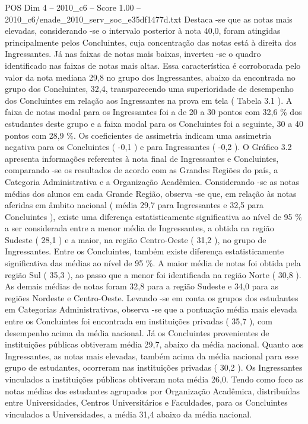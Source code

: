 \begin{textsample}{POS Dim 4 – 2010\_c6 – Score 1.00 – 2010\_c6/enade\_2010\_serv\_soc\_e35df1477d.txt}
Destaca -se que as notas mais elevadas, considerando -se o intervalo posterior à nota 40,0, foram atingidas principalmente pelos Concluintes, cuja concentração das notas está à direita dos Ingressantes.
Já nas faixas de notas mais baixas, inverteu -se o quadro identificado nas faixas de notas mais altas.
Essa característica é corroborada pelo valor da nota mediana 29,8 no grupo dos Ingressantes, abaixo da encontrada no grupo dos Concluintes, 32,4, transparecendo uma superioridade de desempenho dos Concluintes em relação aos Ingressantes na prova em tela ( Tabela 3.1 ).
A faixa de notas modal para os Ingressantes foi a de 20 a 30 pontos com 32,6 \% dos estudantes deste grupo e a faixa modal para os Concluintes foi a seguinte, 30 a 40 pontos com 28,9 \%.
Os coeficientes de assimetria indicam uma assimetria negativa para os Concluintes ( -0,1 ) e para Ingressantes ( -0,2 ).
O Gráfico 3.2 apresenta informações referentes à nota final de Ingressantes e Concluintes, comparando -se os resultados de acordo com as Grandes Regiões do país, a Categoria Administrativa e a Organização Acadêmica.
Considerando -se as notas médias dos alunos em cada Grande Região, observa -se que, em relação às notas aferidas em âmbito nacional ( média 29,7 para Ingressantes e 32,5 para Concluintes ), existe uma diferença estatisticamente significativa ao nível de 95 \% a ser considerada entre a menor média de Ingressantes, a obtida na região Sudeste ( 28,1 ) e a maior, na região Centro-Oeste ( 31,2 ), no grupo de Ingressantes.
Entre os Concluintes, também existe diferença estatisticamente significativa das médias ao nível de 95 \%.
A maior média de notas foi obtida pela região Sul ( 35,3 ), ao passo que a menor foi identificada na região Norte ( 30,8 ).
As demais médias de notas foram 32,8 para a região Sudeste e 34,0 para as regiões Nordeste e Centro-Oeste.
Levando -se em conta os grupos dos estudantes em Categorias Administrativas, observa -se que a pontuação média mais elevada entre os Concluintes foi encontrada em instituições privadas ( 35,7 ), com desempenho acima da média nacional.
Já os Concluintes provenientes de instituições públicas obtiveram média 29,7, abaixo da média nacional.
Quanto aos Ingressantes, as notas mais elevadas, também acima da média nacional para esse grupo de estudantes, ocorreram nas instituições privadas ( 30,2 ).
Os Ingressantes vinculados a instituições públicas obtiveram nota média 26,0.
Tendo como foco as notas médias dos estudantes agrupados por Organização Acadêmica, distribuídas entre Universidades, Centros Universitários e Faculdades, para os Concluintes vinculados a Universidades, a média 31,4 abaixo da média nacional.

\end{textsample}
